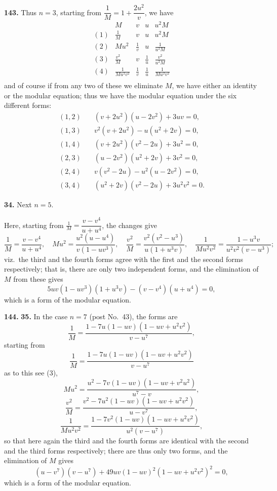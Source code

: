 \documentclass[11pt,a4paper]{book}
\begin{document}
\medskip
\noindent\textbf{143.} Thus $n = 3$, starting from $\dfrac{1}{M} = 1 + \dfrac{2u^2}{v}$, we have
\[
\begin{array}{c|cccc}
& M & v & u & u^2M \\
\hline
(1) & \frac{1}{M} & v & u & u^2M \\
(2) & Mu^2 & \frac{1}{v} & u & \frac{1}{u^2M} \\
(3) & \frac{v^2}{M} & v & \frac{1}{u} & \frac{v^2}{u^2M} \\
(4) & \frac{1}{Mu^2v^2} & \frac{1}{v} & \frac{1}{u} & \frac{1}{Mu^2v^2} \\
\end{array}
\]
and of course if from any two of these we eliminate $M$, we have either an identity or the modular equation; thus we have the modular equation under the six different forms:
\begin{align*}
(1, 2)\quad &(v + 2u^2)(u - 2v^2) + 3uv = 0, \\
(1, 3)\quad &v^2(v + 2u^2) - u(u^2 + 2v) = 0, \\
(1, 4)\quad &(v + 2u^2)(v^2 - 2u) + 3u^2 = 0, \\
(2, 3)\quad &(u - 2v^2)(u^2 + 2v) + 3v^2 = 0, \\
(2, 4)\quad &v(v^2 - 2u) - u^2(u - 2v^2) = 0, \\
(3, 4)\quad &(u^2 + 2v)(v^2 - 2u) + 3u^2v^2 = 0.
\end{align*}

\medskip
\noindent\textbf{34.} Next $n = 5$.

Here, starting from $\frac{1}{M} = \dfrac{v - v^4}{u + u^4}$, the changes give
\[
\frac{1}{M} = \frac{v - v^4}{u + u^4}, \quad
Mu^2 = \frac{u^2(u - u^4)}{v(1 - uv^3)}, \quad
\frac{v^2}{M} = \frac{v^2(v^2 - u^3)}{u(1 + u^3v)}, \quad
\frac{1}{Mu^2v^2} = \frac{1 - u^3v}{u^2v^2(v - u^3)};
\]
viz.\ the third and the fourth forms agree with the first and the second forms respectively; that is, there are only two independent forms, and the elimination of $M$ from these gives
\[
5uv(1 - uv^3)(1 + u^3v) - (v - v^4)(u + u^4) = 0,
\]
which is a form of the modular equation.


\noindent\textbf{144.} \textbf{35.} In the case $n = 7$ (post No.~43), the forms are
\[
\frac{1}{M} = \frac{1 - 7u(1 - uv)(1 - uv + u^2v^2)}{v - u^7},
\]
starting from
\[
\frac{1}{M} = \frac{1 - 7u(1 - uv)(1 - uv + u^2v^2)}{v - u^7}
\]
as to this see (3),
\[
Mu^2 = \frac{u^2 - 7v(1 - uv)(1 - uv + v^2u^2)}{u^7 - v},
\]
\[
\frac{v^2}{M} = \frac{v^2 - 7u^2(1 - uv)(1 - uv + u^2v^2)}{u - v^7},
\]
\[
\frac{1}{Mu^2v^2} = \frac{1 - 7v^2(1 - uv)(1 - uv + u^2v^2)}{u^2(v - u^7)},
\]
so that here again the third and the fourth forms are identical with the second and the third forms respectively; there are thus only two forms, and the elimination of $M$ gives
\[
(u - v^7)(v - u^7) + 49uv(1 - uv)^2(1 - uv + u^2v^2)^2 = 0,
\]
which is a form of the modular equation.
\end{document}
